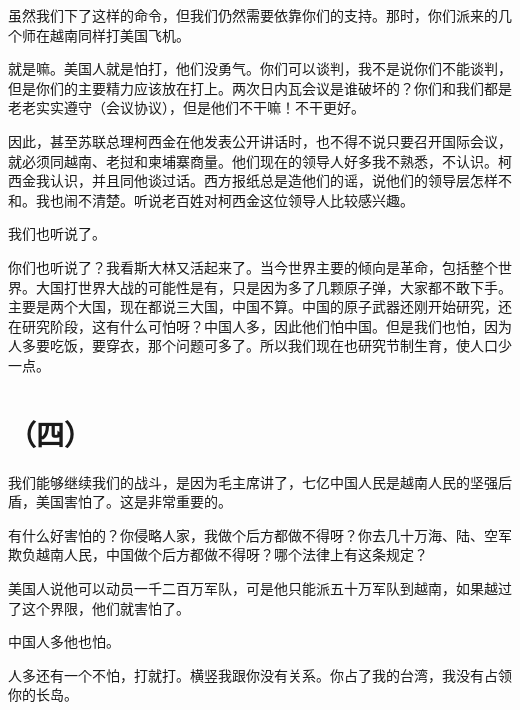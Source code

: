 虽然我们下了这样的命令，但我们仍然需要依靠你们的支持。那时，你们派来的几个师在越南同样打美国飞机。

就是嘛。美国人就是怕打，他们没勇气。你们可以谈判，我不是说你们不能谈判，但是你们的主要精力应该放在打上。两次日内瓦会议是谁破坏的？你们和我们都是老老实实遵守（会议协议），但是他们不干嘛！不干更好。

因此，甚至苏联总理柯西金在他发表公开讲话时，也不得不说只要召开国际会议，就必须同越南、老挝和柬埔寨商量。他们现在的领导人好多我不熟悉，不认识。柯西金我认识，并且同他谈过话。西方报纸总是造他们的谣，说他们的领导层怎样不和。我也闹不清楚。听说老百姓对柯西金这位领导人比较感兴趣。

我们也听说了。

你们也听说了？我看斯大林又活起来了。当今世界主要的倾向是革命，包括整个世界。大国打世界大战的可能性是有，只是因为多了几颗原子弹，大家都不敢下手。主要是两个大国，现在都说三大国，中国不算。中国的原子武器还刚开始研究，还在研究阶段，这有什么可怕呀？中国人多，因此他们怕中国。但是我们也怕，因为人多要吃饭，要穿衣，那个问题可多了。所以我们现在也研究节制生育，使人口少一点。

\section*{（四）}

我们能够继续我们的战斗，是因为毛主席讲了，七亿中国人民是越南人民的坚强后盾，美国害怕了。这是非常重要的。

有什么好害怕的？你侵略人家，我做个后方都做不得呀？你去几十万海、陆、空军欺负越南人民，中国做个后方都做不得呀？哪个法律上有这条规定？

美国人说他可以动员一千二百万军队，可是他只能派五十万军队到越南，如果越过了这个界限，他们就害怕了。

中国人多他也怕。

人多还有一个不怕，打就打。横竖我跟你没有关系。你占了我的台湾，我没有占领你的长岛。

